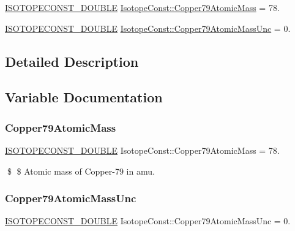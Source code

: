 \begin{DoxyCompactItemize}
\item 
\mbox{\hyperlink{group___isotope_const-_macros_ga8f45a7272ce02c0b4c65c44636ed719a}{I\+S\+O\+T\+O\+P\+E\+C\+O\+N\+S\+T\+\_\+\+D\+O\+U\+B\+LE}} \mbox{\hyperlink{group___isotope_const-_copper-_cu79_gadcd9f6b365f16c1f25bddaf91b4e02ad}{Isotope\+Const\+::\+Copper79\+Atomic\+Mass}} = 78.
\item 
\mbox{\hyperlink{group___isotope_const-_macros_ga8f45a7272ce02c0b4c65c44636ed719a}{I\+S\+O\+T\+O\+P\+E\+C\+O\+N\+S\+T\+\_\+\+D\+O\+U\+B\+LE}} \mbox{\hyperlink{group___isotope_const-_copper-_cu79_gacdfe5b19dcaa6b8a1f51b6f3dc8148ef}{Isotope\+Const\+::\+Copper79\+Atomic\+Mass\+Unc}} = 0.
\end{DoxyCompactItemize}


\subsection{Detailed Description}


\subsection{Variable Documentation}
\mbox{\label{group___isotope_const-_copper-_cu79_gadcd9f6b365f16c1f25bddaf91b4e02ad}} 
\subsubsection{\texorpdfstring{Copper79\+Atomic\+Mass}{Copper79AtomicMass}}
{\footnotesize\ttfamily \mbox{\hyperlink{group___isotope_const-_macros_ga8f45a7272ce02c0b4c65c44636ed719a}{I\+S\+O\+T\+O\+P\+E\+C\+O\+N\+S\+T\+\_\+\+D\+O\+U\+B\+LE}} Isotope\+Const\+::\+Copper79\+Atomic\+Mass = 78.}

\$ \$ Atomic mass of Copper-\/79 in amu. \mbox{\label{group___isotope_const-_copper-_cu79_gacdfe5b19dcaa6b8a1f51b6f3dc8148ef}} 
\subsubsection{\texorpdfstring{Copper79\+Atomic\+Mass\+Unc}{Copper79AtomicMassUnc}}
{\footnotesize\ttfamily \mbox{\hyperlink{group___isotope_const-_macros_ga8f45a7272ce02c0b4c65c44636ed719a}{I\+S\+O\+T\+O\+P\+E\+C\+O\+N\+S\+T\+\_\+\+D\+O\+U\+B\+LE}} Isotope\+Const\+::\+Copper79\+Atomic\+Mass\+Unc = 0.}

